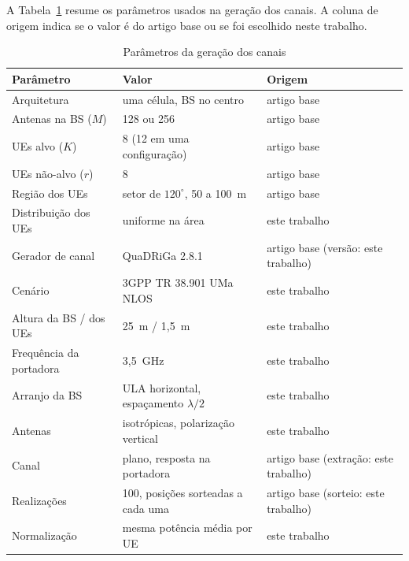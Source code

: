 
A Tabela~\ref{tab:parametros-canal} resume os parâmetros usados na geração dos canais. A coluna de origem indica se o valor é do artigo base ou se foi escolhido neste trabalho.

\begin{table}[h]
    \caption{Parâmetros da geração dos canais}
    \label{tab:parametros-canal}
    \begin{center}
    \begin{tabular}{lll}
        \hline
        Parâmetro & Valor & Origem \\
        \hline
        Arquitetura & uma célula, BS no centro & artigo base \\
        Antenas na BS ($M$) & 128 ou 256 & artigo base \\
        UEs alvo ($K$) & 8 (12 em uma configuração) & artigo base \\
        UEs não-alvo ($r$) & 8 & artigo base \\
        Região dos UEs & setor de $120^\circ$, 50 a 100~m & artigo base \\
        Distribuição dos UEs & uniforme na área & este trabalho \\
        Gerador de canal & QuaDRiGa 2.8.1 & artigo base (versão: este trabalho) \\
        Cenário & 3GPP TR 38.901 UMa NLOS & este trabalho \\
        Altura da BS / dos UEs & 25~m / 1,5~m & este trabalho \\
        Frequência da portadora & 3,5~GHz & este trabalho \\
        Arranjo da BS & ULA horizontal, espaçamento $\lambda/2$ & este trabalho \\
        Antenas & isotrópicas, polarização vertical & este trabalho \\
        Canal & plano, resposta na portadora & artigo base (extração: este trabalho) \\
        Realizações & 100, posições sorteadas a cada uma & artigo base (sorteio: este trabalho) \\
        Normalização & mesma potência média por UE & este trabalho \\
        \hline
    \end{tabular}
    \end{center}
\end{table}
